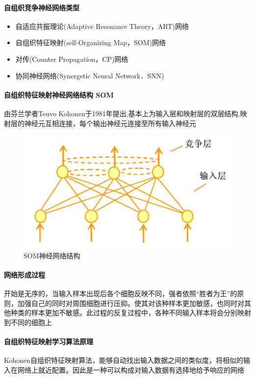 \documentclass[UTF8,a4paper]{ctexart}
\begin{document}
\paragraph{自组织竞争神经网络类型}
\begin{itemize}
	\item 自适应共振理论(Adaptive Resonance Theory，ART)网络
	\item 自组织特征映射(self-Organizing Map，SOM)网络
	\item 对传(Counter Propagation，CP)网络
	\item 协同神经网络(Synergetic Neural Network．SNN)
\end{itemize}

\paragraph{自组织特征映射神经网络结构 SOM}
由芬兰学者Teuvo Kohonen于1981年提出,基本上为输入层和映射层的双层结构,映射层的神经元互相连接，每个输出神经元连接至所有输入神经元
\begin{figure}[H]
	\centering
	\includegraphics[scale = 0.3]{assets/ArtificialIntelligence/2018-01-09-13-59-31.png}
	\caption{SOM神经网络结构}
\end{figure}

\paragraph{网络形成过程}
开始是无序的，当输入样本出现后各个细胞反映不同，强者依照“胜者为王”的原则，加强自己的同时对周围细胞进行压抑。使其对该种样本更加敏感，也同时对其他种类的样本更加不敏感。此过程的反复过程中，各种不同输入样本将会分别映射到不同的细胞上

\paragraph{自组织特征映射学习算法原理}
Kohonen自组织特征映射算法，能够自动找出输入数据之间的类似度，将相似的输入在网络上就近配置。因此是一种可以构成对输入数据有选择地给予响应的网络
\end{document}
